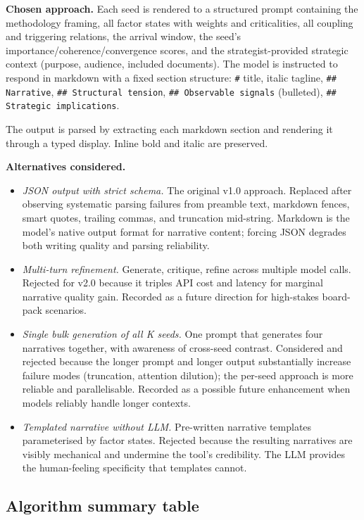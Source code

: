 \documentclass[11pt,a4paper]{article}
\begin{document}
\textbf{Chosen approach.} Each seed is rendered to a structured prompt containing the methodology framing, all factor states with weights and criticalities, all coupling and triggering relations, the arrival window, the seed's importance/coherence/convergence scores, and the strategist-provided strategic context (purpose, audience, included documents). The model is instructed to respond in markdown with a fixed section structure: \texttt{\#} title, italic tagline, \texttt{\#\# Narrative}, \texttt{\#\# Structural tension}, \texttt{\#\# Observable signals} (bulleted), \texttt{\#\# Strategic implications}.

The output is parsed by extracting each markdown section and rendering it through a typed display. Inline bold and italic are preserved.

\textbf{Alternatives considered.}

\begin{itemize}[leftmargin=*]
  \item \emph{JSON output with strict schema.} The original v1.0 approach. Replaced after observing systematic parsing failures from preamble text, markdown fences, smart quotes, trailing commas, and truncation mid-string. Markdown is the model's native output format for narrative content; forcing JSON degrades both writing quality and parsing reliability.
  \item \emph{Multi-turn refinement.} Generate, critique, refine across multiple model calls. Rejected for v2.0 because it triples API cost and latency for marginal narrative quality gain. Recorded as a future direction for high-stakes board-pack scenarios.
  \item \emph{Single bulk generation of all K seeds.} One prompt that generates four narratives together, with awareness of cross-seed contrast. Considered and rejected because the longer prompt and longer output substantially increase failure modes (truncation, attention dilution); the per-seed approach is more reliable and parallelisable. Recorded as a possible future enhancement when models reliably handle longer contexts.
  \item \emph{Templated narrative without LLM.} Pre-written narrative templates parameterised by factor states. Rejected because the resulting narratives are visibly mechanical and undermine the tool's credibility. The LLM provides the human-feeling specificity that templates cannot.
\end{itemize}

\subsection{Algorithm summary table}
\end{document}

